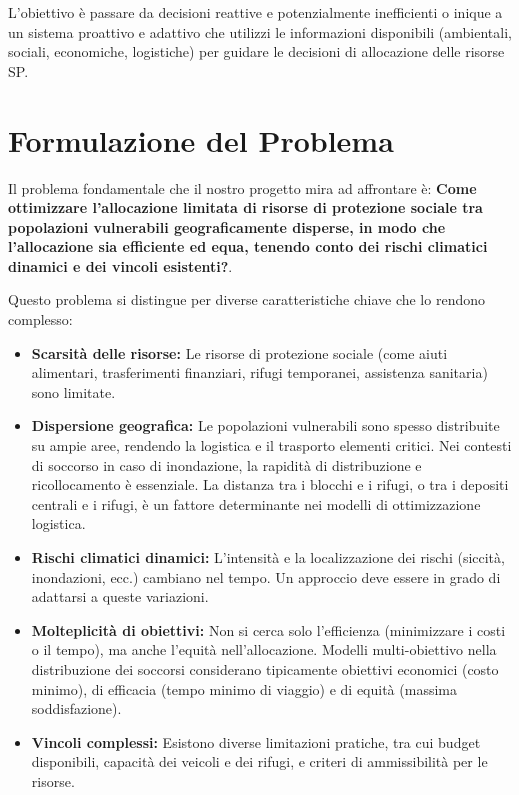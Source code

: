 \documentclass{article}
\begin{document}
L'obiettivo è passare da decisioni reattive e potenzialmente inefficienti o inique a un sistema proattivo e adattivo che utilizzi le informazioni disponibili (ambientali, sociali, economiche, logistiche) per guidare le decisioni di allocazione delle risorse SP.

\section{Formulazione del Problema}
Il problema fondamentale che il nostro progetto mira ad affrontare è: \textbf{Come ottimizzare l'allocazione limitata di risorse di protezione sociale tra popolazioni vulnerabili geograficamente disperse, in modo che l'allocazione sia efficiente ed equa, tenendo conto dei rischi climatici dinamici e dei vincoli esistenti?}.

Questo problema si distingue per diverse caratteristiche chiave che lo rendono complesso:
\begin{itemize}
    \item \textbf{Scarsità delle risorse:} Le risorse di protezione sociale (come aiuti alimentari, trasferimenti finanziari, rifugi temporanei, assistenza sanitaria) sono limitate.
    \item \textbf{Dispersione geografica:} Le popolazioni vulnerabili sono spesso distribuite su ampie aree, rendendo la logistica e il trasporto elementi critici. Nei contesti di soccorso in caso di inondazione, la rapidità di distribuzione e ricollocamento è essenziale. La distanza tra i blocchi e i rifugi, o tra i depositi centrali e i rifugi, è un fattore determinante nei modelli di ottimizzazione logistica.
    \item \textbf{Rischi climatici dinamici:} L'intensità e la localizzazione dei rischi (siccità, inondazioni, ecc.) cambiano nel tempo. Un approccio deve essere in grado di adattarsi a queste variazioni.
    \item \textbf{Molteplicità di obiettivi:} Non si cerca solo l'efficienza (minimizzare i costi o il tempo), ma anche l'equità nell'allocazione. Modelli multi-obiettivo nella distribuzione dei soccorsi considerano tipicamente obiettivi economici (costo minimo), di efficacia (tempo minimo di viaggio) e di equità (massima soddisfazione).
    \item \textbf{Vincoli complessi:} Esistono diverse limitazioni pratiche, tra cui budget disponibili, capacità dei veicoli e dei rifugi, e criteri di ammissibilità per le risorse.
\end{itemize}
\end{document}
